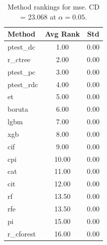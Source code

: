 \begin{table}[h]
\centering
\caption{Method rankings for mse. CD = 23.068 at $\alpha=0.05$.}
\label{tab:ranks_mse}
\begin{tabular}{lcc}
\toprule
Method & Avg Rank & Std \\
\midrule
ptest_dc & 1.00 & 0.00 \\
r_ctree & 2.00 & 0.00 \\
ptest_pc & 3.00 & 0.00 \\
ptest_rdc & 4.00 & 0.00 \\
et & 5.00 & 0.00 \\
boruta & 6.00 & 0.00 \\
lgbm & 7.00 & 0.00 \\
xgb & 8.00 & 0.00 \\
cif & 9.00 & 0.00 \\
cpi & 10.00 & 0.00 \\
cat & 11.00 & 0.00 \\
cit & 12.00 & 0.00 \\
rf & 13.50 & 0.00 \\
rfe & 13.50 & 0.00 \\
pi & 15.00 & 0.00 \\
r_cforest & 16.00 & 0.00 \\
\bottomrule
\end{tabular}
\end{table}